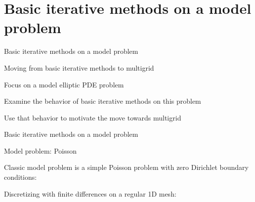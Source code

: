 \documentclass[18pt,xcolor=table]{beamer}
\begin{document}
\section{Basic iterative methods on a model problem}


\begin{frame}{Basic iterative methods on a model problem}
\begin{block}{Moving from basic iterative methods to multigrid}
\bit
\item Focus on a model elliptic PDE problem
\item Examine the behavior of basic iterative methods on this problem
\item Use that behavior to motivate the move towards multigrid
\eit
\end{block}
\end{frame}

\begin{frame}{Basic iterative methods on a model problem}
\begin{block}{Model problem: Poisson}
\bit
\item Classic model problem is a simple Poisson problem with zero Dirichlet boundary conditions:
\item Discretizing with finite differences on a regular 1D mesh:
\eit
{}
\end{block}
\end{frame}
\end{document}
